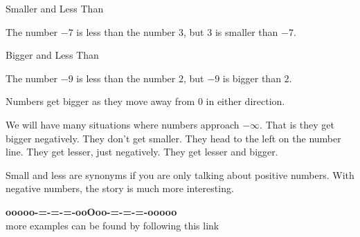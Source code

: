 \documentclass{ximera}
\begin{document}
\begin{example} Smaller and Less Than


The number $-7$ is less than the number $3$, but $3$ is smaller than $-7$.



\end{example}



\begin{example} Bigger and Less Than


The number $-9$ is less than the number $2$, but $-9$ is bigger than $2$.



\end{example}






Numbers get bigger as they move away from $0$ in either direction. 




We will have many situations where numbers approach $-\infty$.  That is they get bigger negatively.  They don't get smaller.  They head to the left on the number line. They get lesser, just negatively.  They get lesser and bigger. 



Small and less are synonyms if you are only talking about positive numbers. With negative numbers, the story is much more interesting.















\begin{center}
\textbf{\textcolor{green!50!black}{ooooo-=-=-=-ooOoo-=-=-=-ooooo}} \\

more examples can be found by following this link\\ 

\end{center}
\end{document}
